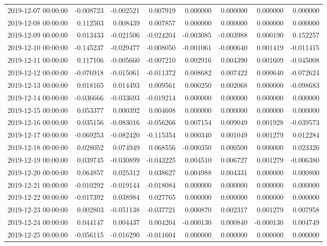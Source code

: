 \begin{tabular}{lrrrrrrr}
2019-12-07 00:00:00 & -0.008723 & -0.002521 & 0.007919 & 0.000000 & 0.000000 & 0.000000 & 0.000000 \\
2019-12-08 00:00:00 & 0.112503 & 0.008439 & 0.007857 & 0.000000 & 0.000000 & 0.000000 & 0.000000 \\
2019-12-09 00:00:00 & 0.013433 & -0.021506 & -0.024204 & -0.003085 & -0.003988 & 0.000190 & 0.152257 \\
2019-12-10 00:00:00 & -0.145237 & -0.029477 & -0.008050 & -0.001061 & -0.000640 & 0.001419 & -0.011415 \\
2019-12-11 00:00:00 & 0.117106 & -0.005660 & -0.007210 & 0.002916 & 0.004390 & 0.001609 & -0.045008 \\
2019-12-12 00:00:00 & -0.076918 & -0.015061 & -0.011372 & 0.008682 & 0.007422 & 0.000640 & -0.072624 \\
2019-12-13 00:00:00 & 0.018165 & 0.014493 & 0.009561 & 0.000250 & 0.002068 & 0.000000 & -0.098683 \\
2019-12-14 00:00:00 & -0.036666 & -0.033693 & -0.019214 & 0.000000 & 0.000000 & 0.000000 & 0.000000 \\
2019-12-15 00:00:00 & 0.053377 & 0.000392 & 0.004608 & 0.000000 & 0.000000 & 0.000000 & 0.000000 \\
2019-12-16 00:00:00 & 0.035156 & -0.083016 & -0.056266 & 0.007154 & 0.009049 & 0.001928 & -0.039573 \\
2019-12-17 00:00:00 & -0.069253 & -0.082420 & -0.115354 & 0.000340 & 0.001049 & 0.001279 & 0.012284 \\
2019-12-18 00:00:00 & 0.028052 & 0.074949 & 0.068556 & -0.000350 & 0.000500 & 0.000000 & 0.023326 \\
2019-12-19 00:00:00 & 0.039745 & -0.030899 & -0.043225 & 0.004510 & 0.006727 & 0.001279 & -0.006380 \\
2019-12-20 00:00:00 & 0.064857 & 0.025312 & 0.038627 & 0.004988 & 0.004331 & 0.000000 & 0.000800 \\
2019-12-21 00:00:00 & -0.010292 & -0.019144 & -0.018084 & 0.000000 & 0.000000 & 0.000000 & 0.000000 \\
2019-12-22 00:00:00 & -0.017392 & 0.038984 & 0.027765 & 0.000000 & 0.000000 & 0.000000 & 0.000000 \\
2019-12-23 00:00:00 & 0.002803 & -0.051138 & -0.037721 & 0.000870 & 0.002317 & 0.001279 & 0.007958 \\
2019-12-24 00:00:00 & 0.044147 & 0.004437 & 0.004204 & -0.000130 & 0.000840 & -0.000130 & 0.004749 \\
2019-12-25 00:00:00 & -0.056115 & -0.016290 & -0.011604 & 0.000000 & 0.000000 & 0.000000 & 0.000000 \\

\end{tabular}
